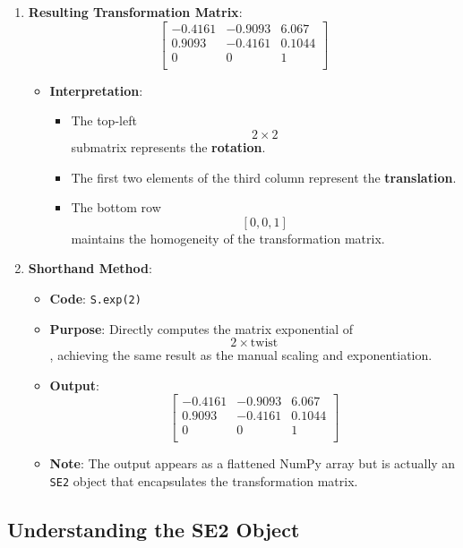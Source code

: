 \documentclass[12pt]{article}
\begin{document}
\begin{enumerate}
    \item \textbf{Resulting Transformation Matrix}:
        $$
        \begin{bmatrix}
        -0.4161 & -0.9093 & 6.067 \\
        0.9093 & -0.4161 & 0.1044 \\
        0 & 0 & 1 \\
        \end{bmatrix}
        $$
        \begin{itemize}
            \item \textbf{Interpretation}:
                \begin{itemize}
                    \item The top-left $$ 2 \times 2 $$ submatrix represents the \textbf{rotation}.
                    \item The first two elements of the third column represent the \textbf{translation}.
                    \item The bottom row $$ [0, 0, 1] $$ maintains the homogeneity of the transformation matrix.
                \end{itemize}
        \end{itemize}
    
    \item \textbf{Shorthand Method}:
        \begin{itemize}
            \item \textbf{Code}: \texttt{S.exp(2)}
            \item \textbf{Purpose}: Directly computes the matrix exponential of $$ 2 \times \text{twist} $$, achieving the same result as the manual scaling and exponentiation.
            \item \textbf{Output}:
                $$
                \begin{bmatrix}
                -0.4161 & -0.9093 & 6.067 \\
                0.9093 & -0.4161 & 0.1044 \\
                0 & 0 & 1 \\
                \end{bmatrix}
                $$
            \item \textbf{Note}: The output appears as a flattened NumPy array but is actually an \texttt{SE2} object that encapsulates the transformation matrix.
        \end{itemize}
\end{enumerate}

\subsection{Understanding the SE2 Object}
\end{document}
